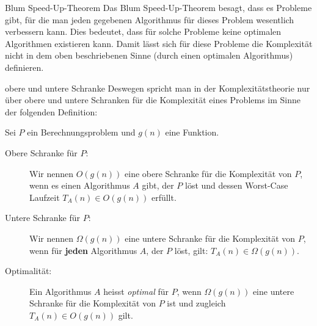 \begin{frame}{Blum Speed-Up-Theorem}
Das Blum Speed-Up-Theorem besagt, dass es Probleme gibt, für die man jeden gegebenen Algorithmus für
dieses Problem wesentlich verbessern kann. Dies bedeutet, dass für solche Probleme keine
optimalen Algorithmen existieren kann. Damit lässt sich für diese Probleme die Komplexität
nicht in dem oben beschriebenen Sinne (durch einen optimalen Algorithmus) definieren.
\end{frame}

\begin{frame}{obere und untere Schranke}
Deswegen spricht man in der Komplexitätstheorie nur über obere und untere Schranken für die Komplexität eines
Problems im Sinne der folgenden Definition:
{\scriptsize\begin{mydefinition}\label{mydefinition:schranke}
Sei $P$ ein Berechnungsproblem und $g(n)$ eine Funktion.
    \begin{description}
        \item[Obere Schranke für $P$:] Wir nennen $O(g(n))$ eine obere Schranke für die Komplexität von $P$, wenn es einen Algorithmus $A$ gibt, der $P$ löst und dessen Worst-Case Laufzeit $T_A(n) \in O(g(n))$ erfüllt.
        
        \item[Untere Schranke für $P$:] Wir nennen $\Omega(g(n))$ eine untere Schranke für die Komplexität von $P$, wenn für \textbf{jeden} Algorithmus $A$, der $P$ löst, gilt: $T_A(n) \in \Omega(g(n))$.
        
        \item[Optimalität:] Ein Algorithmus $A$ heisst \emph{optimal} für $P$, wenn $\Omega(g(n))$ eine untere Schranke für die Komplexität von $P$ ist und zugleich $T_A(n) \in O(g(n))$ gilt.
    \end{description}
\end{mydefinition}}
\end{frame}




